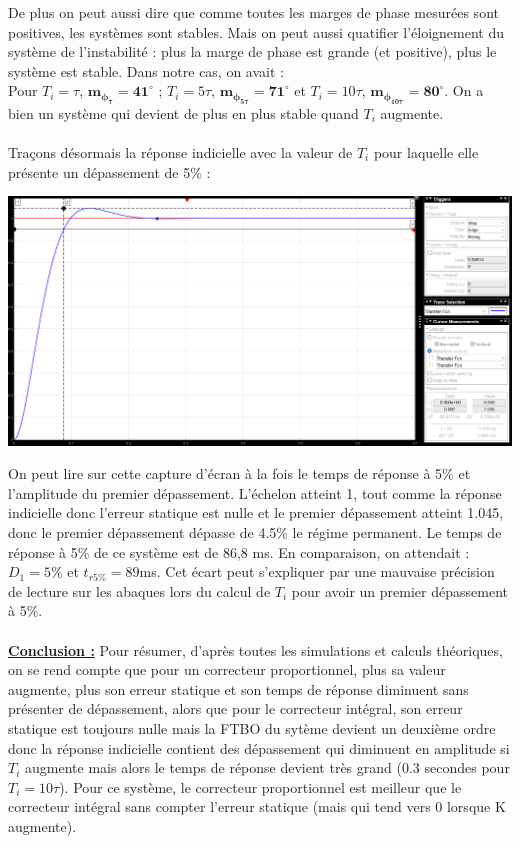 \documentclass[12pt]{article}
\begin{document}
De plus on peut aussi dire que comme toutes les marges de phase mesurées sont positives, les systèmes sont stables. Mais on peut aussi quatifier l'éloignement du système de l'instabilité : plus la marge de phase est grande (et positive), plus le système est stable. Dans notre cas, on avait :
\\Pour $T_i = \tau$, $\mathbf{m_{\phi_{\tau}} = 41^{\circ}}$  ; $T_i = 5\tau$, $\mathbf{m_{\phi_{5\tau}} = 71^{\circ}}$ et $T_i = 10\tau$, $\mathbf{m_{\phi_{10\tau}} = 80^{\circ}}$.
On a bien un système qui devient de plus en plus stable quand $T_i$ augmente.
\\\\Traçons désormais la réponse indicielle avec la valeur de $T_i$ pour laquelle elle présente un dépassement de 5$\%$ : 
\begin{center}
    \includegraphics[width = 19 cm]{TP2 Simulink/Syst_1/dep5prct_syst1.png}
\end{center}

On peut lire sur cette capture d'écran à la fois le temps de réponse à 5$\%$ et l'amplitude du premier dépassement. L'échelon atteint 1, tout comme la réponse indicielle donc l'erreur statique est nulle et le premier dépassement atteint 1.045, donc le premier dépassement dépasse de 4.5$\%$ le régime permanent. Le temps de réponse à 5$\%$ de ce système est de 86,8 ms.
En comparaison, on attendait : $D_1 = 5\%$ et $t_{r5\%} = 89$ms. Cet écart peut s'expliquer par une mauvaise précision de lecture sur les abaques lors du calcul de $T_i$ pour avoir un premier dépassement à 5$\%$.
\\\\\underline{\bf Conclusion :} Pour résumer, d'après toutes les simulations et calculs théoriques, on se rend compte que pour un correcteur proportionnel, plus sa valeur augmente, plus son erreur statique et son temps de réponse diminuent sans présenter de dépassement, alors que pour le correcteur intégral, son erreur statique est toujours nulle mais la FTBO du sytème devient un deuxième ordre donc la réponse indicielle contient des dépassement qui diminuent en amplitude si $T_i$ augmente mais alors le temps de réponse devient très grand (0.3 secondes pour $T_i = 10\tau$). Pour ce système, le correcteur proportionnel est meilleur que le correcteur intégral sans compter l'erreur statique (mais qui tend vers 0 lorsque K augmente). 
\newpage
\end{document}
